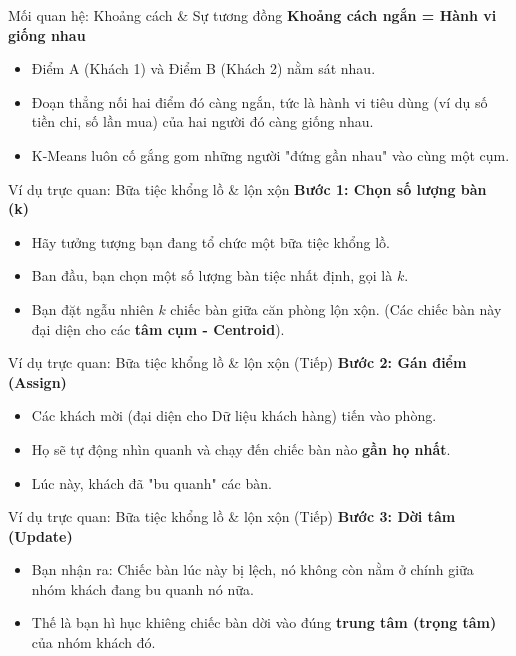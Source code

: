 \documentclass[aspectratio=169]{beamer}
\begin{document}
\begin{frame}{Mối quan hệ: Khoảng cách \& Sự tương đồng}
    \textbf{Khoảng cách ngắn = Hành vi giống nhau}
    \begin{itemize}
        \item Điểm A (Khách 1) và Điểm B (Khách 2) nằm sát nhau.
        \item Đoạn thẳng nối hai điểm đó càng ngắn, tức là hành vi tiêu dùng (ví dụ số tiền chi, số lần mua) của hai người đó càng giống nhau.
        \item K-Means luôn cố gắng gom những người "đứng gần nhau" vào cùng một cụm.
    \end{itemize}
\end{frame}

\begin{frame}{Ví dụ trực quan: Bữa tiệc khổng lồ \& lộn xộn}
    \textbf{Bước 1: Chọn số lượng bàn (k)}
    \begin{itemize}
        \item Hãy tưởng tượng bạn đang tổ chức một bữa tiệc khổng lồ.
        \item Ban đầu, bạn chọn một số lượng bàn tiệc nhất định, gọi là $k$.
        \item Bạn đặt ngẫu nhiên $k$ chiếc bàn giữa căn phòng lộn xộn. (Các chiếc bàn này đại diện cho các \textbf{tâm cụm - Centroid}).
    \end{itemize}
\end{frame}

\begin{frame}{Ví dụ trực quan: Bữa tiệc khổng lồ \& lộn xộn (Tiếp)}
    \textbf{Bước 2: Gán điểm (Assign)}
    \begin{itemize}
        \item Các khách mời (đại diện cho Dữ liệu khách hàng) tiến vào phòng.
        \item Họ sẽ tự động nhìn quanh và chạy đến chiếc bàn nào \textbf{gần họ nhất}.
        \item Lúc này, khách đã "bu quanh" các bàn.
    \end{itemize}
\end{frame}

\begin{frame}{Ví dụ trực quan: Bữa tiệc khổng lồ \& lộn xộn (Tiếp)}
    \textbf{Bước 3: Dời tâm (Update)}
    \begin{itemize}
        \item Bạn nhận ra: Chiếc bàn lúc này bị lệch, nó không còn nằm ở chính giữa nhóm khách đang bu quanh nó nữa.
        \item Thế là bạn hì hục khiêng chiếc bàn dời vào đúng \textbf{trung tâm (trọng tâm)} của nhóm khách đó.
    \end{itemize}
\end{frame}
\end{document}
